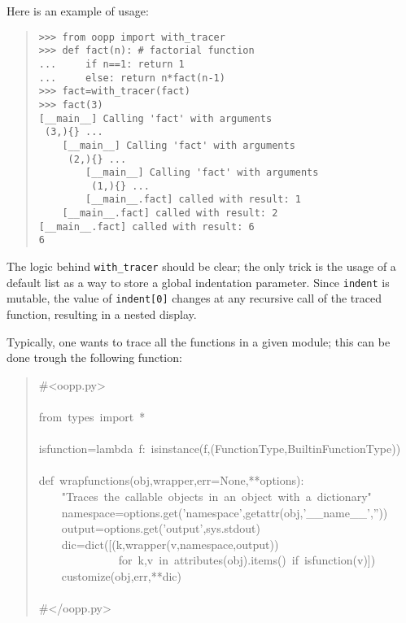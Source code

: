 \documentclass[10pt,english]{article}
\begin{document}
Here is an example of usage:
\begin{quote}
\begin{verbatim}>>> from oopp import with_tracer
>>> def fact(n): # factorial function
...     if n==1: return 1
...     else: return n*fact(n-1)
>>> fact=with_tracer(fact)
>>> fact(3)
[__main__] Calling 'fact' with arguments
 (3,){} ...
    [__main__] Calling 'fact' with arguments
     (2,){} ...
        [__main__] Calling 'fact' with arguments
         (1,){} ...
        [__main__.fact] called with result: 1
    [__main__.fact] called with result: 2
[__main__.fact] called with result: 6
6\end{verbatim}
\end{quote}

The logic behind \texttt{with{\_}tracer} should be clear; the only trick is the
usage of a default list as a way to store a global indentation parameter.
Since \texttt{indent} is mutable, the value of \texttt{indent[0]} changes at any
recursive call of the traced function, resulting in a nested display.

Typically, one wants to trace all the functions in a given module; 
this can be done trough the following function:
\begin{quote}
\begin{ttfamily}\begin{flushleft}
\mbox{{\#}<oopp.py>}\\
\mbox{}\\
\mbox{from~types~import~*}\\
\mbox{}\\
\mbox{isfunction=lambda~f:~isinstance(f,(FunctionType,BuiltinFunctionType))}\\
\mbox{}\\
\mbox{def~wrapfunctions(obj,wrapper,err=None,**options):}\\
\mbox{~~~~"Traces~the~callable~objects~in~an~object~with~a~dictionary"}\\
\mbox{~~~~namespace=options.get('namespace',getattr(obj,'{\_}{\_}name{\_}{\_}',''))}\\
\mbox{~~~~output=options.get('output',sys.stdout)}\\
\mbox{~~~~dic=dict([(k,wrapper(v,namespace,output))~}\\
\mbox{~~~~~~~~~~~~~~for~k,v~in~attributes(obj).items()~if~isfunction(v)])}\\
\mbox{~~~~customize(obj,err,**dic)}\\
\mbox{}\\
\mbox{{\#}</oopp.py>}
\end{flushleft}\end{ttfamily}
\end{quote}
\end{document}
